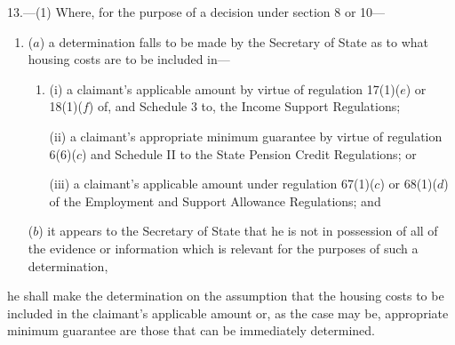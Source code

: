 \documentclass[12pt,a4paper]{article}
\begin{document}
13.—(1) Where, for the purpose of a decision under section 8 or 10—
\begin{enumerate}\item[]

($a$) a determination falls to be made by the Secretary of State as to what housing costs are to be included in—
\begin{enumerate}\item[]
(i) a claimant’s applicable amount by virtue of regulation 17(1)($e$)  or 18(1)($f$)  of, and Schedule 3 to, the Income Support Regulations; 

(ii) a claimant’s appropriate minimum guarantee by virtue of regulation 6(6)($c$)  and Schedule II to the State Pension Credit Regulations; 
%
or

(iii) a claimant’s applicable amount under regulation 67(1)($c$)  or 68(1)($d$)  of the Employment and Support Allowance Regulations; and
\end{enumerate}

($b$) it appears to the Secretary of State that he is not in possession of all of the evidence or information which is relevant for the purposes of such a determination,
\end{enumerate}
he shall make the determination on the assumption that the housing costs to be included in the claimant’s 
applicable amount or, as the case may be, appropriate minimum guarantee are those  %
that can be immediately determined.
\end{document}
